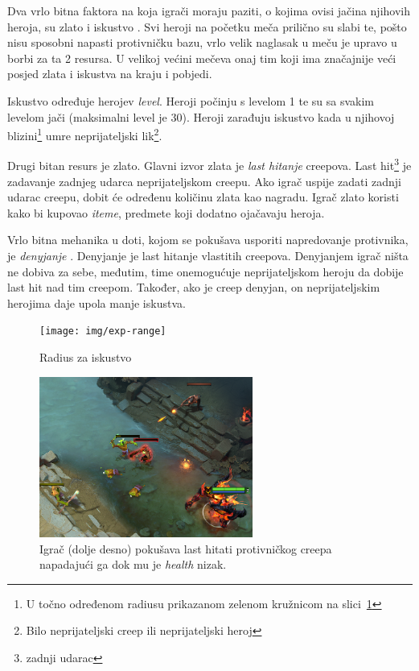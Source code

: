 \documentclass[times, utf8, zavrsni, numeric]{fer}
\begin{document}
Dva vrlo bitna faktora na koja igrači moraju paziti, o kojima ovisi jačina
njihovih heroja, su zlato  i iskustvo . Svi heroji
na početku meča prilično su slabi te, pošto nisu sposobni napasti protivničku
bazu, vrlo velik naglasak u meču je upravo u borbi za ta 2 resursa. U velikoj
većini mečeva onaj tim koji ima značajnije veći posjed zlata i iskustva na kraju
i pobjedi.


Iskustvo određuje herojev \emph{level}. Heroji počinju s levelom 1 te su sa
svakim levelom jači (maksimalni level je 30). Heroji zarađuju iskustvo kada u
njihovoj blizini\footnote{U točno određenom radiusu prikazanom zelenom kružnicom
na slici~\ref{fig:exp-range}} umre neprijateljski lik\footnote{Bilo
neprijateljski creep ili neprijateljski heroj}.


Drugi bitan resurs je zlato. Glavni izvor zlata je \emph{last hitanje} creepova.
Last hit\footnote{zadnji udarac } je zadavanje zadnjeg udarca
neprijateljskom creepu. Ako igrač uspije zadati zadnji udarac creepu, dobit će
određenu količinu zlata kao nagradu. Igrač zlato koristi kako bi kupovao
\emph{iteme}, predmete koji dodatno ojačavaju heroja.


Vrlo bitna mehanika u doti, kojom se pokušava usporiti napredovanje protivnika,
je \emph{denyjanje} . Denyjanje je last hitanje vlastitih creepova.
Denyjanjem igrač ništa ne dobiva za sebe, međutim, time onemogućuje
neprijateljskom heroju da dobije last hit nad tim creepom. Također, ako je creep
denyjan, on neprijateljskim herojima daje upola manje iskustva.

\begin{figure}[h] 
    \centering
    \texttt{[image: img/exp-range]}
    \caption{Radius za iskustvo}\label{fig:exp-range}
\end{figure}

\begin{figure}[h] 
    \centering
    \includegraphics[width=7cm]{img/last-hit}
    \caption{Igrač (dolje desno) pokušava last hitati protivničkog creepa
    napadajući ga dok mu je \emph{health} nizak.}\label{fig:last-hit}
\end{figure}
\end{document}
